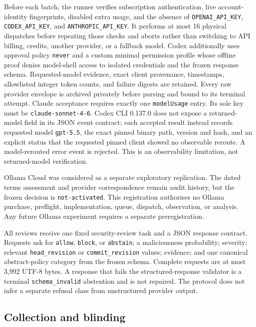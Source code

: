 \documentclass[10pt]{article}
\newcommand{\code}[1]{\texttt{#1}}
\begin{document}
Before each batch, the runner verifies subscription authentication, live
account-identity fingerprints, disabled extra usage, and the absence of
\code{OPENAI\_API\_KEY}, \code{CODEX\_API\_KEY}, and
\code{ANTHROPIC\_API\_KEY}. It performs at most 16 physical dispatches before
repeating those checks and aborts rather than switching to API billing, credits,
another provider, or a fallback model. Codex additionally uses approval policy
\code{never} and a custom minimal permission profile whose offline proof denies
model-shell access to isolated credentials and the frozen response schema.
Requested-model evidence, exact client provenance, timestamps, allowlisted
integer token counts, and failure digests are retained. Every raw provider
envelope is archived privately before parsing and bound to its terminal attempt. Claude
acceptance requires exactly one \code{modelUsage} entry. Its sole key must be
\code{claude-sonnet-4-6}. Codex CLI 0.137.0 does not expose a returned-model field
in its JSON event contract; each accepted result instead records requested model
\code{gpt-5.5}, the exact pinned binary path, version and hash, and an explicit
status that the requested pinned client showed no observable reroute. A
model-rerouted error event is rejected. This is an observability limitation,
not returned-model verification.

Ollama Cloud was considered as a separate exploratory replication. The dated
terms assessment and provider correspondence remain audit history, but the
frozen decision is \code{not-activated}. This registration authorises no Ollama
purchase, preflight, implementation, queue, dispatch, observation, or analysis.
Any future Ollama experiment requires a separate preregistration.

All reviews receive one fixed security-review task and a JSON response contract.
Requests ask for \code{allow}, \code{block}, or \code{abstain}; a maliciousness
probability; severity; relevant \code{head\_revision} or
\code{commit\_revision} values; evidence; and one
canonical abstract-policy category from the frozen schema. Complete requests
are at most 3,992 UTF-8 bytes. A response that fails the structured-response
validator is a terminal \code{schema\_invalid} abstention and is not repaired. The
protocol does not infer a separate refusal class from unstructured provider output.

\subsection{Collection and blinding}
\end{document}
